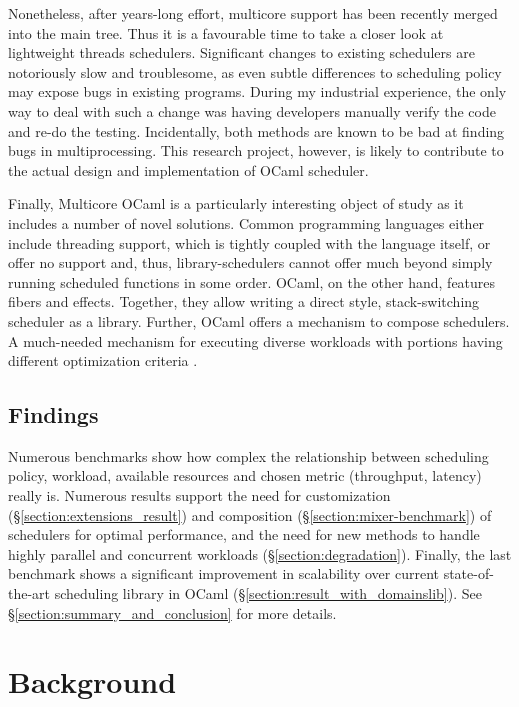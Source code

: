 \documentclass[12pt,a4paper,twoside]{report}
\begin{document}
Nonetheless, after years-long effort, multicore support has been recently merged into the main tree. Thus it is a favourable time to take a closer look at lightweight threads schedulers. Significant changes to existing schedulers are notoriously slow and troublesome, as even subtle differences to scheduling policy may expose bugs in existing programs. During my industrial experience, the only way to deal with such a change was having developers manually verify the code and re-do the testing. Incidentally, both methods are known to be bad at finding bugs in multiprocessing. This research project, however, is likely to contribute to the actual design and implementation of OCaml scheduler. 

Finally, Multicore OCaml is a particularly interesting object of study as it includes a number of novel solutions. Common programming languages either include threading support, which is tightly coupled with the language itself, or offer no support and, thus, library-schedulers cannot offer much beyond simply running scheduled functions in some order. OCaml, on the other hand, features fibers and effects. Together, they allow writing a direct style, stack-switching scheduler as a library. Further, OCaml offers a mechanism to compose schedulers. A much-needed mechanism for executing diverse workloads with portions having different optimization criteria \cite{Tennenhouse89layeredmultiplexing}.


\section{Findings}
\label{section:findings}

Numerous benchmarks show how complex the relationship between scheduling policy, workload, available resources and chosen metric (throughput, latency) really is. Numerous results support the need for customization (\S\ref{section:extensions_result}) and composition (\S\ref{section:mixer-benchmark}) of schedulers for optimal performance, and the need for new methods to handle highly parallel and concurrent workloads (\S\ref{section:degradation}). Finally, the last benchmark shows a significant improvement in scalability over current state-of-the-art scheduling library in OCaml (\S\ref{section:result_with_domainslib}). See \S\ref{section:summary_and_conclusion} for more details.

\chapter{Background}
\end{document}
